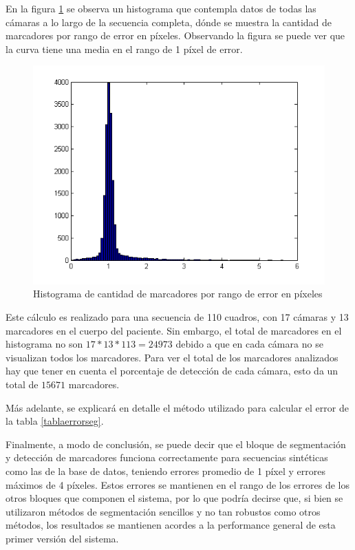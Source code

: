 En la figura \ref{histerr} se observa un histograma que contempla datos de todas las cámaras a lo largo de la secuencia completa, dónde se muestra la cantidad de marcadores por rango de error en píxeles. Observando la figura se puede ver que la curva tiene una media en el rango de 1 píxel de error.  

\begin{figure}[H]
\begin{center}
\includegraphics[scale=0.6]{img/Histo_Error.png}
\end{center}
\vspace{-1cm}
\caption{Histograma de cantidad de marcadores por rango de error en píxeles}
\label{histerr}
\end{figure}

Este cálculo es realizado para una secuencia de 110 cuadros, con 17 cámaras y 13 marcadores en el cuerpo del paciente. Sin embargo, el total de marcadores en el histograma no son $17*13*113 = 24973$ debido a que en cada cámara no se visualizan todos los marcadores. Para ver el total de los marcadores analizados hay que tener en cuenta el porcentaje de detección de cada cámara, esto da un total de $15671$ marcadores.

 Más adelante, se explicará en detalle el método utilizado para calcular el error de la tabla \ref{tablaerrorseg}.

Finalmente, a modo de conclusión, se puede decir que el bloque de segmentación y detección de marcadores funciona correctamente para secuencias sintéticas como las de la base de datos, teniendo errores promedio de 1 píxel y errores máximos de 4 píxeles. Estos errores se mantienen en el rango de los errores de los otros bloques que componen el sistema, por lo que podría decirse que, si bien se utilizaron métodos de segmentación sencillos y no tan robustos como otros métodos, los resultados se mantienen acordes a la performance general de esta primer versión del sistema.

